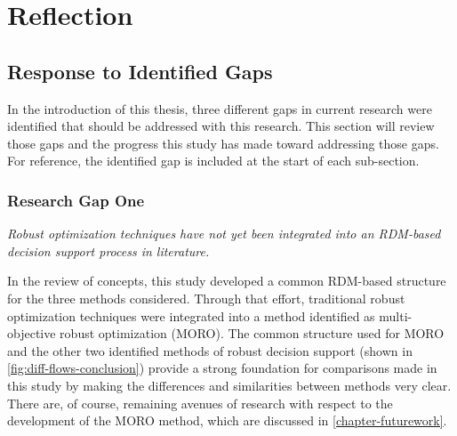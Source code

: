 \chapter{Reflection}
\label{chapter-reflection}

\begin{abstract}
    Given the detailed analysis described throughout this thesis and the conclusions reached, this chapter will discuss the implications of these conclusions. The gaps identified in the introduction will be reviewed and addressed in \cref{reflect-gaps}. The contributions made by this study and their added value to both decision makers and analysts is discussed in \cref{reflect-goals}. Finally a discussion of what the two relevant parties, policy analysts and decision makers, can take away from this study is found in \cref{reflect-application}
\end{abstract}

\newpage

\section{Response to Identified Gaps} \label{reflect-gaps}
In the introduction of this thesis, three different gaps in current research were identified that should be addressed with this research. This section will review those gaps and the progress this study has made toward addressing those gaps. For reference, the identified gap is included at the start of each sub-section. 

    \subsection{Research Gap One}
    \textit{Robust optimization techniques have not yet been integrated into an RDM-based decision support process in literature.}
    
    In the review of concepts, this study developed a common RDM-based structure for the three methods considered. Through that effort, traditional robust optimization techniques were integrated into a method identified as multi-objective robust optimization (MORO). The common structure used for MORO and the other two identified methods of robust decision support (shown in \cref{fig:diff-flows-conclusion}) provide a strong foundation for comparisons made in this study by making the differences and similarities between methods very clear. There are, of course, remaining avenues of research with respect to the development of the MORO method, which are discussed in \cref{chapter-futurework}.
    
